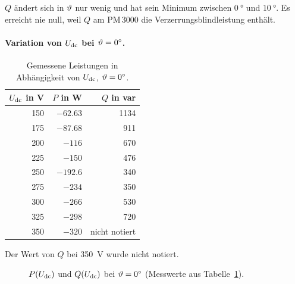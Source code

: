 $Q$ ändert sich in $\vartheta$ nur wenig und hat sein Minimum zwischen $\SI{0}{\degree}$ und $\SI{10}{\degree}$. Es erreicht nie null, weil $Q$ am PM\,3000 die Verzerrungsblindleistung enthält.

\paragraph{\texorpdfstring{Variation von $U_{\mathrm{dc}}$ bei $\vartheta=\SI{0}{\degree}$}{Variation von Udc bei Theta = 0 Grad}.}

\begin{table}[htbp]
  \centering
  \caption{Gemessene Leistungen in Abhängigkeit von $U_{\mathrm{dc}}$, $\vartheta=\SI{0}{\degree}$.}
  \label{tab:udc}
  \begin{tabular}{@{}rrr@{}}
    \toprule
    $U_{\mathrm{dc}}$ in V & $P$ in W & $Q$ in var \\
    \midrule
    150 & $-62.63$ & 1134 \\
    175 & $-87.68$ & 911 \\
    200 & $-116$ & 670 \\
    225 & $-150$ & 476 \\
    250 & $-192.6$ & 340 \\
    275 & $-234$ & 350 \\
    300 & $-266$ & 530 \\
    325 & $-298$ & 720 \\
    350 & $-320$ & nicht notiert \\
    \bottomrule
  \end{tabular}
\end{table}

Der Wert von $Q$ bei \SI{350}{\volt} wurde nicht notiert.

\begin{figure}[htbp]
  \centering
  \caption{$P(U_{\mathrm{dc}})$ und $Q(U_{\mathrm{dc}})$ bei $\vartheta=\SI{0}{\degree}$ (Messwerte aus Tabelle~\ref{tab:udc}).}
  \label{fig:PUdc}
\end{figure}

